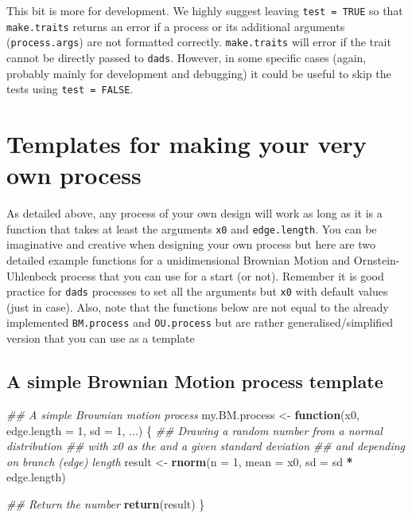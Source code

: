 \documentclass[]{book}
\newenvironment{Shaded}{\begin{snugshade}}{\end{snugshade}}
\newcommand{\CommentTok}[1]{\textcolor[rgb]{0.56,0.35,0.01}{\textit{#1}}}
\newcommand{\ControlFlowTok}[1]{\textcolor[rgb]{0.13,0.29,0.53}{\textbf{#1}}}
\newcommand{\DataTypeTok}[1]{\textcolor[rgb]{0.13,0.29,0.53}{#1}}
\newcommand{\DecValTok}[1]{\textcolor[rgb]{0.00,0.00,0.81}{#1}}
\newcommand{\KeywordTok}[1]{\textcolor[rgb]{0.13,0.29,0.53}{\textbf{#1}}}
\newcommand{\NormalTok}[1]{#1}
\newcommand{\OperatorTok}[1]{\textcolor[rgb]{0.81,0.36,0.00}{\textbf{#1}}}
\newcommand{\StringTok}[1]{\textcolor[rgb]{0.31,0.60,0.02}{#1}}
\begin{document}
This bit is more for development.
We highly suggest leaving \texttt{test\ =\ TRUE} so that \texttt{make.traits} returns an error if a process or its additional arguments (\texttt{process.args}) are not formatted correctly.
\texttt{make.traits} will error if the trait cannot be directly passed to \texttt{dads}.
However, in some specific cases (again, probably mainly for development and debugging) it could be useful to skip the tests using \texttt{test\ =\ FALSE}.

\hypertarget{templates-for-making-your-very-own-process}{%
\section{Templates for making your very own process}\label{templates-for-making-your-very-own-process}}

As detailed above, any process of your own design will work as long as it is a function that takes at least the arguments \texttt{x0} and \texttt{edge.length}.
You can be imaginative and creative when designing your own process but here are two detailed example functions for a unidimensional Brownian Motion and Ornstein-Uhlenbeck process that you can use for a start (or not).
Remember it is good practice for \texttt{dads} processes to set all the arguments but \texttt{x0} with default values (just in case).
Also, note that the functions below are not equal to the already implemented \texttt{BM.process} and \texttt{OU.process} but are rather generalised/simplified version that you can use as a template

\hypertarget{a-simple-brownian-motion-process-template}{%
\subsection{A simple Brownian Motion process template}\label{a-simple-brownian-motion-process-template}}

\begin{Shaded}
\begin{Highlighting}[]
\CommentTok{## A simple Brownian motion process}
\NormalTok{my.BM.process <-}\StringTok{ }\ControlFlowTok{function}\NormalTok{(x0, }\DataTypeTok{edge.length =} \DecValTok{1}\NormalTok{, }\DataTypeTok{sd =} \DecValTok{1}\NormalTok{, ...) \{}
    \CommentTok{## Drawing a random number from a normal distribution}
    \CommentTok{## with x0 as the and a given standard deviation}
    \CommentTok{## and depending on branch (edge) length}
\NormalTok{    result <-}\StringTok{ }\KeywordTok{rnorm}\NormalTok{(}\DataTypeTok{n =} \DecValTok{1}\NormalTok{, }\DataTypeTok{mean =}\NormalTok{ x0, }\DataTypeTok{sd =}\NormalTok{ sd }\OperatorTok{*}\StringTok{ }\NormalTok{edge.length)}

    \CommentTok{## Return the number}
    \KeywordTok{return}\NormalTok{(result)}
\NormalTok{\}}
\end{Highlighting}
\end{Shaded}
\end{document}

